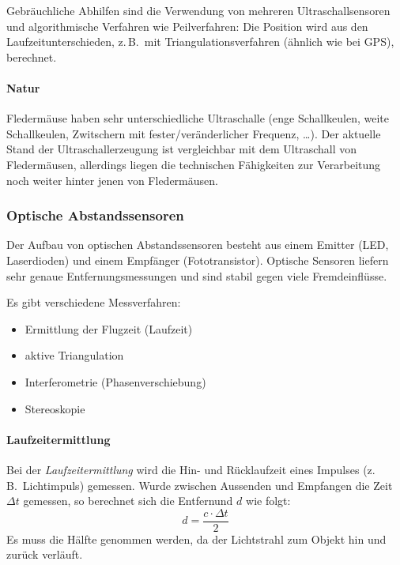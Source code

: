 \documentclass[a4paper, 11pt, accentcolor = tud3b]{tudreport}
\newcommand{\zB}{z.\,B.~}
\begin{document}
						Gebräuchliche Abhilfen sind die Verwendung von mehreren Ultraschallsensoren und algorithmische Verfahren wie Peilverfahren: Die Position wird aus den Laufzeitunterschieden, \zB mit Triangulationsverfahren (ähnlich wie bei GPS), berechnet.

					\paragraph{Natur}
						Fledermäuse haben sehr unterschiedliche Ultraschalle (enge Schallkeulen, weite Schallkeulen, Zwitschern mit fester/veränderlicher Frequenz, \dots). Der aktuelle Stand der Ultraschallerzeugung ist vergleichbar mit dem Ultraschall von Fledermäusen, allerdings liegen die technischen Fähigkeiten zur Verarbeitung noch weiter hinter jenen von Fledermäusen.

				\subsubsection{Optische Abstandssensoren}
					Der Aufbau von optischen Abstandssensoren besteht aus einem Emitter (LED, Laserdioden) und einem Empfänger (Fototransistor). Optische Sensoren liefern sehr genaue Entfernungsmessungen und sind stabil gegen viele Fremdeinflüsse.
					
					Es gibt verschiedene Messverfahren:
					\begin{itemize}
						\item Ermittlung der Flugzeit (Laufzeit)
						\item aktive Triangulation
						\item Interferometrie (Phasenverschiebung)
						\item Stereoskopie
					\end{itemize}

					\paragraph{Laufzeitermittlung}
						Bei der \emph{Laufzeitermittlung} wird die Hin- und Rücklaufzeit eines Impulses (\zB Lichtimpuls) gemessen. Wurde zwischen Aussenden und Empfangen die Zeit \( \Delta t \) gemessen, so berechnet sich die Entfernund \(d\) wie folgt:
						\begin{equation*}
							d = \frac{c \cdot \Delta t}{2}
						\end{equation*}
						Es muss die Hälfte genommen werden, da der Lichtstrahl zum Objekt hin und zurück verläuft.
						
\end{document}
